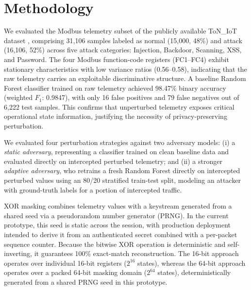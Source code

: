 \documentclass[conference]{IEEEtran}
\begin{document}
\section{Methodology}
We evaluated the Modbus telemetry subset of the publicly available ToN\_IoT dataset \cite{toniot}, comprising 31,106 samples labeled as normal (15,000, 48\%) and attack (16,106, 52\%) across five attack categories: Injection, Backdoor, Scanning, XSS, and Password. The four Modbus function-code registers (FC1--FC4) exhibit stationary characteristics with low variance ratios (0.56--0.58), indicating that the raw telemetry carries an exploitable discriminative structure. A baseline Random Forest classifier trained on raw telemetry achieved 98.47\% binary accuracy (weighted $F_1$: 0.9847), with only 16 false positives and 79 false negatives out of 6,222 test samples. This confirms that unperturbed telemetry exposes critical operational state information, justifying the necessity of privacy-preserving perturbation.

We evaluated four perturbation strategies against two adversary models: (i) a \textit{static adversary}, representing a classifier trained on clean baseline data and evaluated directly on intercepted perturbed telemetry; and (ii) a stronger \textit{adaptive adversary}, who retrains a fresh Random Forest directly on intercepted perturbed values using an 80/20 stratified train-test split, modeling an attacker with ground-truth labels for a portion of intercepted traffic.

XOR masking combines telemetry values with a keystream generated from a shared seed via a pseudorandom number generator (PRNG). In the current prototype, this seed is static across the session, with production deployment intended to derive it from an authenticated secret combined with a per-packet sequence counter. Because the bitwise XOR operation is deterministic and self-inverting, it guarantees 100\% exact-match reconstruction. The 16-bit approach operates over individual 16-bit registers ($2^{16}$ states), whereas the 64-bit approach operates over a packed 64-bit masking domain ($2^{64}$ states), deterministically generated from a shared PRNG seed in this prototype.
\end{document}
